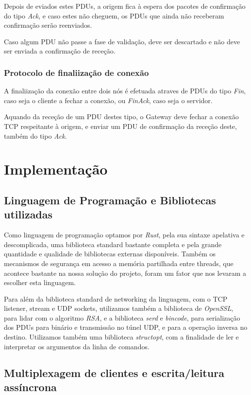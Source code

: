 \documentclass[a4paper]{report}
\begin{document}
Depois de eviados estes PDUs, a origem fica à espera dos pacotes de confirmação
do tipo \textit{Ack}, e caso estes não cheguem, os PDUs que ainda não receberam
confirmação serão reenviados.

Caso algum PDU não passe a fase de validação, deve ser descartado e não deve
ser enviada a confirmação de receção.

\subsection{Protocolo de finaliização de conexão}

A finaliização da conexão entre dois nós é efetuada atraves de PDUs do tipo
\textit{Fin}, caso seja o cliente a fechar a conexão, ou \textit{FinAck},
caso seja o servidor.

Aquando da receção de um PDU destes tipo, o Gateway deve fechar a conexão TCP
respeitante à origem, e enviar um PDU de confirmação da receção deste, também
do tipo \textit{Ack}.

\chapter{Implementação}

\section{Linguagem de Programação e Bibliotecas utilizadas}

Como linguagem de programação optamos por \textit{Rust}, pela sua sintaxe
apelativa e descomplicada, uma biblioteca standard bastante completa e pela
grande quantidade e qualidade de bibliotecas externas disponíveis. Também
os mecanismos de segurança em acesso a memória partilhada entre threads,
que acontece bastante na nossa solução do projeto, foram um fator que nos
levaram a escolher esta linguagem.

Para além da biblioteca standard de networking da linguagem, com o TCP
listener, stream e UDP sockets, utilizamos também a biblioteca de 
\textit{OpenSSL}, para lidar com o algoritmo \textit{RSA}, e a biblioteca
\textit{serd} e \textit{bincode}, para serialização dos PDUs para binário
e transmissão no túnel UDP, e para a operação inversa no destino. Utilizamos
também uma biblioteca \textit{structopt}, com a finalidade de ler e interpretar 
os argumentos da linha de comandos.

\section{Multiplexagem de clientes e escrita/leitura assíncrona}
\end{document}
